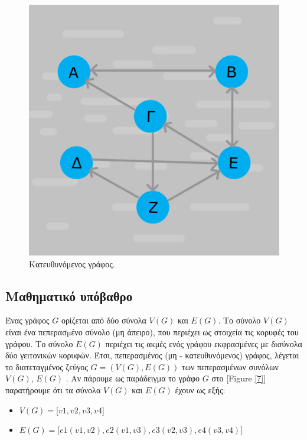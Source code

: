 \begin{figure}[h]
\begin{minipage}[c]{.46\linewidth}
        \includegraphics[scale=0.15]{2947_thesis/pictures/directed.png} 
        \caption{Κατευθυνόμενος γράφος.}
        \label{6}
    \end{minipage}
\end{figure}

\subsection{Μαθηματικό υπόβαθρο}
Ένας γράφος $G$ ορίζεται από δύο σύνολα $V(G)$ και $E(G)$. Το σύνολο $V(G)$ είναι ένα πεπερασµένο σύνολο (μη άπειρο), που περιέχει ως στοιχεία τις κορυφές του γράφου. Το σύνολο $E(G)$ περιέχει τις ακμές ενός γράφου εκφρασμένες με δισύνολα δύο γειτονικών κορυφών. Έτσι, πεπερασμένος (μη - κατευθυνόμενος) γράφος, λέγεται το διατεταγμένος ζεύγος $G = (V(G), E(G))$ των πεπερασμένων συνόλων $V(G)$, $E(G)$ \cite{ntenisiwtis2023thewria}. Αν πάρουμε ως παράδειγμα το γράφο $G$ στο [Figure \ref{7}] παρατήρουμε ότι τα σύνολα $V(G)$ και $E(G)$ έχουν ως εξής: 
\begin{itemize}
  \item $V(G)=$[$v1,v2,v3,v4$]
  \item $E(G)=$[$e1(v1,v2),e2(v1,v3),e3(v2,v3),e4(v3,v4)$] 
\end{itemize}

